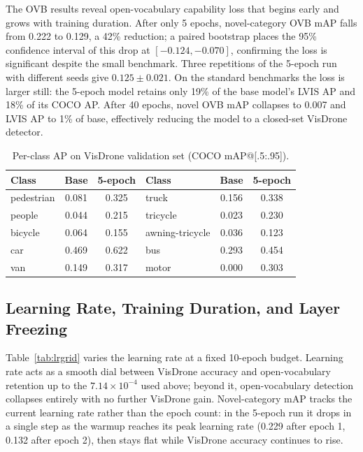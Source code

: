 \documentclass[conf]{new-aiaa}
\begin{document}
The OVB results reveal open-vocabulary capability loss that begins early and grows with
training duration. After only 5 epochs, novel-category OVB mAP falls from 0.222 to 0.129, a
42\% reduction; a paired bootstrap places the 95\% confidence interval of this drop at
$[-0.124, -0.070]$, confirming the loss is significant despite the small benchmark. Three
repetitions of the 5-epoch run with different seeds give $0.125 \pm 0.021$. On the standard
benchmarks the loss is larger still: the 5-epoch model retains only 19\% of the base model's
LVIS AP and 18\% of its COCO AP. After 40 epochs, novel OVB mAP collapses to 0.007 and LVIS AP
to 1\% of base, effectively reducing the model to a closed-set VisDrone detector.

\begin{table}[hbt!]
\caption{Per-class AP on VisDrone validation set
         (COCO mAP@[.5:.95]).}
\label{tab:perclass}
\centering
\begin{tabular}{lcc|lcc}
\hline
\textbf{Class} & \textbf{Base} & \textbf{5-epoch} &
\textbf{Class} & \textbf{Base} & \textbf{5-epoch} \\
\hline
pedestrian      & 0.081 & 0.325 & truck           & 0.156 & 0.338 \\
people          & 0.044 & 0.215 & tricycle        & 0.023 & 0.230 \\
bicycle         & 0.064 & 0.155 & awning-tricycle & 0.036 & 0.123 \\
car             & 0.469 & 0.622 & bus             & 0.293 & 0.454 \\
van             & 0.149 & 0.317 & motor           & 0.000 & 0.303 \\
\hline
\end{tabular}
\end{table}

\subsection{Learning Rate, Training Duration, and Layer Freezing}

Table~\ref{tab:lrgrid} varies the learning rate at a fixed 10-epoch budget. Learning rate acts
as a smooth dial between VisDrone accuracy and open-vocabulary retention up to the
$7.14\times10^{-4}$ used above; beyond it, open-vocabulary detection collapses entirely with no
further VisDrone gain. Novel-category mAP tracks the current learning rate rather than the
epoch count: in the 5-epoch run it drops in a single step as the warmup reaches its peak
learning rate (0.229 after epoch 1, 0.132 after epoch 2), then stays flat while VisDrone
accuracy continues to rise.
\end{document}
